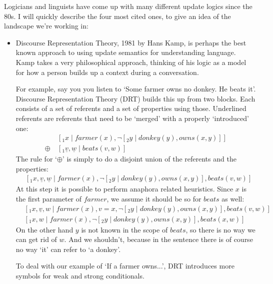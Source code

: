 \documentclass[12pt]{article}
\begin{document}
Logicians and linguists have come up with many different update logics since the 80s. I will quickly describe the four most cited ones, to give an idea of the landscape we're working in:
%
\begin{itemize}
\item Discourse Representation Theory, 1981 by Hans Kamp\cite{kamp1981theory}, is perhaps the best known approach to using update semantics for understanding language. Kamp takes a very philosophical approach, thinking of his logic as a model for how a person builds up a context during a conversation.

For example, say you you listen to `Some farmer owns no donkey. He beats it'. Discourse Representation Theory (DRT) builds this up from two blocks. Each consists of a set of referents and a set of properties using those. Underlined referents are referents that need to be `merged' with a properly `introduced' one:
%
\begin{align}
&[_1 x\mid farmer(x), \neg[_2 y\mid donkey(y), owns(x,y)] ] \nonumber\\
\oplus\ & [_1 \underline{v}, \underline{w}\mid beats(v,w) ] \nonumber
\end{align}
%
The rule for `$\oplus$' is simply to do a disjoint union of the referents and the properties:
%
\begin{align}
&[_1 x, \underline{v}, \underline{w}\mid farmer(x), \neg[_2 y\mid donkey(y), owns(x,y)], beats(v,w) ] \nonumber
\end{align}
%
At this step it is possible to perform anaphora related heuristics. Since $x$ is the first parameter of $farmer$, we assume it should be so for $beats$ as well:
%
\begin{align}
&[_1 x, \underline{v}, w\mid farmer(x), v=x, \neg[_2 y\mid donkey(y), owns(x,y)], beats(v,w) ] \nonumber\\
&[_1 x, w\mid farmer(x), \neg[_2 y\mid donkey(y), owns(x,y)], beats(x,w) ]\nonumber
\end{align}
%
On the other hand $y$ is not known in the scope of $beats$, so there is no way we can get rid of $w$. And we shouldn't, because in the sentence there is of course no way `it' can refer to `a donkey'.

To deal with our example of `If a farmer owns...', DRT introduces more symbols for weak and strong conditionals.



\end{itemize}
\end{document}
